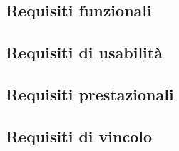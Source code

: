 \documentclass[11pt]{article}
\begin{document}
\begin{justify}
\subsection{Requisiti funzionali}
\subsection{Requisiti di usabilità}
\subsection{Requisiti prestazionali}
\subsection{Requisiti di vincolo}


\end{justify}
\end{document}
